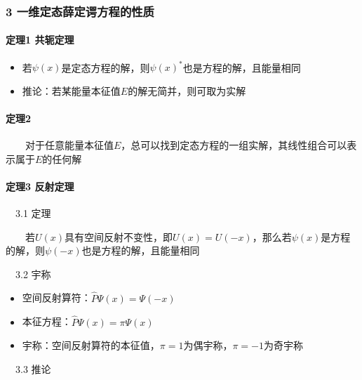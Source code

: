 \documentclass[UTF8,twocolumn]{ctexart}
\providecommand{\tightlist}{%
  \setlength{\itemsep}{0pt}\setlength{\parskip}{0pt}}
\let\oldparagraph\paragraph
\renewcommand{\paragraph}[1]{\oldparagraph{#1}\mbox{}}
\begin{document}
\hypertarget{ux4e00ux7ef4ux5b9aux6001ux859bux5b9aux8c14ux65b9ux7a0bux7684ux6027ux8d28}{%
\subsubsection{3
一维定态薛定谔方程的性质}\label{ux4e00ux7ef4ux5b9aux6001ux859bux5b9aux8c14ux65b9ux7a0bux7684ux6027ux8d28}}

\hypertarget{ux5b9aux74061-ux5171ux8f6dux5b9aux7406}{%
\paragraph{{ }定理1
共轭定理}\label{ux5b9aux74061-ux5171ux8f6dux5b9aux7406}}

\begin{itemize}
\tightlist
\item
  若\(\psi(x)\)是定态方程的解，则\(\psi(x)^*\)也是方程的解，且能量相同
\item
  推论：若某能量本征值\(E\)的解无简并，则可取为实解
\end{itemize}

\hypertarget{ux5b9aux74062}{%
\paragraph{{ }定理2}\label{ux5b9aux74062}}

  对于任意能量本征值\(E\)，总可以找到定态方程的一组实解，其线性组合可以表示属于\(E\)的任何解

\hypertarget{ux5b9aux74063-ux53cdux5c04ux5b9aux7406}{%
\paragraph{{ }定理3
反射定理}\label{ux5b9aux74063-ux53cdux5c04ux5b9aux7406}}

 3.1 定理

  若\(U(x)\)具有空间反射不变性，即\(U(x)=U(-x)\)，那么若\(\psi(x)\)是方程的解，则\(\psi(-x)\)也是方程的解，且能量相同

 3.2 宇称

\begin{itemize}
\tightlist
\item
  空间反射算符：\(\hat{P}\Psi(x)=\Psi(-x)\)
\item
  本征方程：\(\hat{P}\Psi(x)=\pi\Psi(x)\)
\item
  宇称：空间反射算符的本征值，\(\pi=1\)为偶宇称，\(\pi=-1\)为奇宇称
\end{itemize}

 3.3 推论
\end{document}
